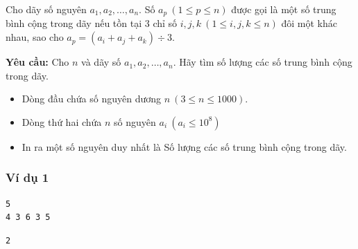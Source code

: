 
Cho dãy số nguyên $a_1, a_2, \dots, a_n$. Số $a_p\ (1 \le p \le n)$ được gọi là một số trung bình cộng trong dãy nếu tồn tại 3 chỉ số $i, j, k\ (1 \le i, j, k \le n)$ đôi một khác nhau, sao cho $a_p=(a_i+a_j+a_k) \div 3$.

\medskip
\textbf{Yêu cầu:} Cho $n$ và dãy số $a_1, a_2, \dots, a_n$. Hãy tìm số lượng các số trung bình cộng trong dãy.

\begin{itemize}
    \item Dòng đầu chứa số nguyên dương $n\ (3 \le n \le 1000)$.
    \item Dòng thứ hai chứa $n$ số nguyên $a_i\ (a_i \le 10^{8})$
\end{itemize}

\begin{itemize}
    \item In ra một số nguyên duy nhất là Số lượng các số trung bình cộng trong dãy.
\end{itemize}


\subsubsection*{Ví dụ 1}
\begin{makesample}
\begin{lstlisting}
5
4 3 6 3 5
\end{lstlisting}
\nextsample
\begin{lstlisting}
2
\end{lstlisting}
\end{makesample}
